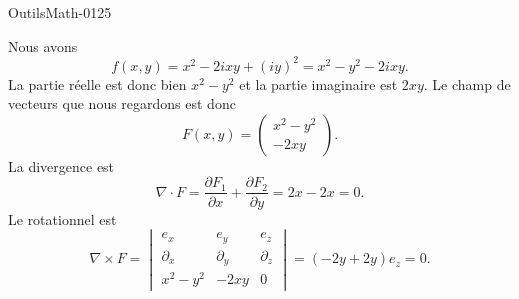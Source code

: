 
\begin{corrige}{OutilsMath-0125}

        Nous avons 
        \begin{equation}
            f(x,y)=x^2-2ixy+(iy)^2=x^2-y^2-2ixy.
        \end{equation}
        La partie réelle est donc bien \( x^2-y^2\) et la partie imaginaire est \( 2xy\). Le champ de vecteurs que nous regardons est donc
        \begin{equation}
            F(x,y)=\begin{pmatrix}
                x^2-y^2    \\ 
                -2xy    
            \end{pmatrix}.
        \end{equation}
        La divergence est
        \begin{equation}
            \nabla\cdot F=\frac{ \partial F_1 }{ \partial x }+\frac{ \partial F_2 }{ \partial y }=2x-2x=0.
        \end{equation}
        Le rotationnel est 
        \begin{equation}
            \nabla\times F=\begin{vmatrix}
                e_x    &   e_y    &   e_z    \\
                \partial_x    &   \partial_y    &   \partial_z    \\
                x^2-y^2    &   -2xy    &   0
            \end{vmatrix}=(-2y+2y)e_z=0.
        \end{equation}

\end{corrige}
